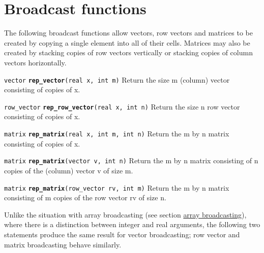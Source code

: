\documentclass[
  10pt,
]{book}
\begin{document}
\hypertarget{matrix-broadcast}{%
\section{Broadcast functions}\label{matrix-broadcast}}

The following broadcast functions allow vectors, row vectors and
matrices to be created by copying a single element into all of their
cells. Matrices may also be created by stacking copies of row vectors
vertically or stacking copies of column vectors horizontally.


\texttt{vector} \textbf{\texttt{rep\_vector}}\texttt{(real\ x,\ int\ m)}\newline
Return the size m (column) vector consisting of copies of x.


\texttt{row\_vector} \textbf{\texttt{rep\_row\_vector}}\texttt{(real\ x,\ int\ n)}\newline
Return the size n row vector consisting of copies of x.


\texttt{matrix} \textbf{\texttt{rep\_matrix}}\texttt{(real\ x,\ int\ m,\ int\ n)}\newline
Return the m by n matrix consisting of copies of x.


\texttt{matrix} \textbf{\texttt{rep\_matrix}}\texttt{(vector\ v,\ int\ n)}\newline
Return the m by n matrix consisting of n copies of the (column) vector
v of size m.


\texttt{matrix} \textbf{\texttt{rep\_matrix}}\texttt{(row\_vector\ rv,\ int\ m)}\newline
Return the m by n matrix consisting of m copies of the row vector rv
of size n.

Unlike the situation with array broadcasting (see section
\protect\hyperlink{array-broadcasting}{array broadcasting}), where there is a distinction between
integer and real arguments, the following two statements produce the
same result for vector broadcasting; row vector and matrix
broadcasting behave similarly.
\end{document}
